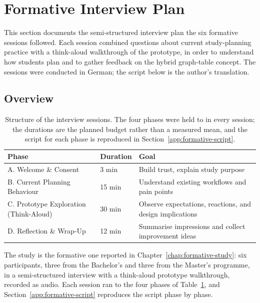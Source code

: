 \section{Formative Interview Plan}
\label{app:formative-interview-plan}

This section documents the semi-structured interview plan the six formative sessions followed. Each session combined questions about current study-planning practice with a think-aloud walkthrough of the prototype, in order to understand how students plan and to gather feedback on the hybrid graph-table concept. The sessions were conducted in German; the script below is the author's translation.

\subsection{Overview}

\begin{table}[!t]
\centering
\begin{tabular}{p{4.2cm}p{2.2cm}p{7.2cm}}
\hline
\textbf{Phase} & \textbf{Duration} & \textbf{Goal} \\
\hline
A. Welcome \& Consent & 3 min & Build trust, explain study purpose \\
B. Current Planning Behaviour & 15 min & Understand existing workflows and pain points \\
C. Prototype Exploration (Think-Aloud) & 30 min & Observe expectations, reactions, and design implications \\
D. Reflection \& Wrap-Up & 12 min & Summarise impressions and collect improvement ideas \\
\hline
\end{tabular}
\caption{Structure of the interview sessions. The four phases were held to in every session; the durations are the planned budget rather than a measured mean, and the script for each phase is reproduced in Section~\ref{app:formative-script}.}
\label{tab:interview-structure}
\end{table}

The study is the formative one reported in Chapter~\ref{chap:formative-study}: six participants, three from the Bachelor's and three from the Master's programme, in a semi-structured interview with a think-aloud prototype walkthrough, recorded as audio. Each session ran to the four phases of Table~\ref{tab:interview-structure}, and Section~\ref{app:formative-script} reproduces the script phase by phase.

